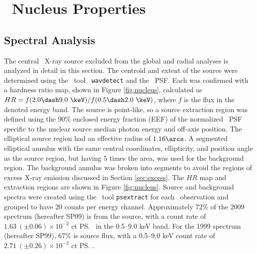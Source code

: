 \documentclass[useAMS,usenatbib]{mn2e}
\begin{document}
\section{\irs\ Nucleus Properties}
\label{sec:centsrc}

\subsection{Spectral Analysis}

The central \irs\ X-ray source excluded from the global and radial
analyses is analyzed in detail in this section. The centroid and
extent of the source were determined using the \ciao\ tool {\tt
  wavdetect} and the \cxo\ PSF. Each was confirmed with a hardness
ratio map, shown in Figure \ref{fig:nucleus}, calculated as $HR =
f(2.0 \dash 9.0 ~\keV) / f(0.5 \dash 2.0 ~\keV)$, where $f$ is the
flux in the denoted energy band. The source is point-like, so a source
extraction region was defined using the 90\% enclosed energy fraction
(EEF) of the normalized \cxo\ PSF specific to the nuclear source
median photon energy and off-axis position. The elliptical source
region had an effective radius of $1.16\arcs$. A segmented elliptical
annulus with the same central coordinates, ellipticity, and position
angle as the source region, but having 5 times the area, was used for
the background region. The background annulus was broken into segments
to avoid the regions of excess X-ray emission discussed in Section
\ref{sec:excess}. The $HR$ map and extraction regions are shown in
Figure \ref{fig:nucleus}. Source and background spectra were created
using the \ciao\ tool {\tt psextract} for each \cxo\ observation and
grouped to have 20 counts per energy channel. Approximately 72\% of
the 2009 spectrum (hereafter SP09) is from the source, with a count
rate of $1.63 ~(\pm 0.06) \times 10^{-2}$ ct \ps\ in the 0.5--9.0 keV
band. For the 1999 spectrum (hereafter SP99), 67\% is source flux,
with a 0.5--9.0 keV count rate of $2.71 ~(\pm 0.26) \times 10^{-2}$ ct
\ps.
\end{document}
